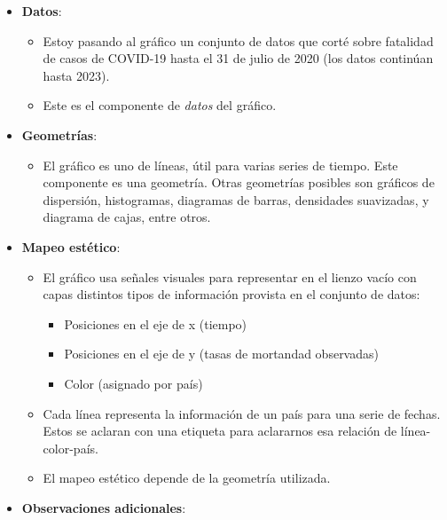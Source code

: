 \documentclass[
]{article}
\providecommand{\tightlist}{%
  \setlength{\itemsep}{0pt}\setlength{\parskip}{0pt}}
\begin{document}
\begin{itemize}
\tightlist
\item
  \textbf{Datos}:

  \begin{itemize}
  \tightlist
  \item
    Estoy pasando al gráfico un conjunto de datos que corté sobre
    fatalidad de casos de COVID-19 hasta el 31 de julio de 2020 (los
    datos continúan hasta 2023).\\
  \item
    Este es el componente de \emph{datos} del gráfico.
  \end{itemize}
\item
  \textbf{Geometrías}:

  \begin{itemize}
  \tightlist
  \item
    El gráfico es uno de líneas, útil para varias series de tiempo. Este
    componente es una geometría. Otras geometrías posibles son gráficos
    de dispersión, histogramas, diagramas de barras, densidades
    suavizadas, y diagrama de cajas, entre otros.\\
  \end{itemize}
\item
  \textbf{Mapeo estético}:

  \begin{itemize}
  \tightlist
  \item
    El gráfico usa señales visuales para representar en el lienzo vacío
    con capas distintos tipos de información provista en el conjunto de
    datos:

    \begin{itemize}
    \tightlist
    \item
      Posiciones en el eje de x (tiempo)\\
    \item
      Posiciones en el eje de y (tasas de mortandad observadas)\\
    \item
      Color (asignado por país)\\
    \end{itemize}
  \item
    Cada línea representa la información de un país para una serie de
    fechas. Estos se aclaran con una etiqueta para aclararnos esa
    relación de línea-color-país.\\
  \item
    El mapeo estético depende de la geometría utilizada.
  \end{itemize}
\item
  \textbf{Observaciones adicionales}:\\


\end{itemize}
\end{document}
